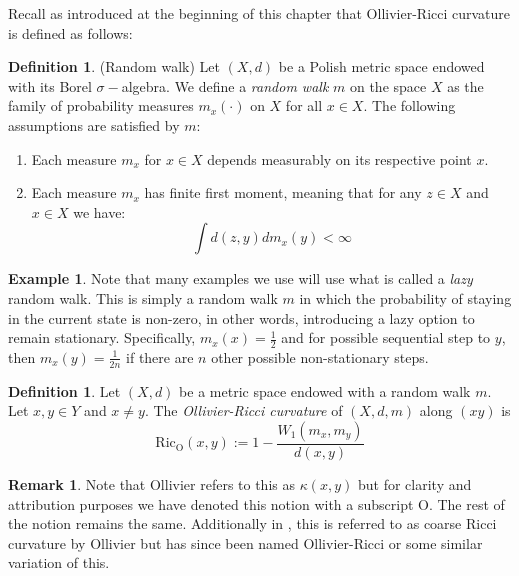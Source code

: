 \documentclass{Dissertate}
\theoremstyle{definition}
\theoremstyle{definition} %
\theoremstyle{definition}
\newtheorem{definition}[theorem]{Definition}
\newtheorem{example}[theorem]{Example}
\newtheorem{remark}[theorem]{Remark}
\begin{document}
Recall as introduced at the beginning of this chapter that Ollivier-Ricci curvature is defined as follows: 
\begin{definition} (Random walk) Let $(X,d)$ be a Polish metric space endowed with its Borel $\sigma-$algebra. We define a \textit{random walk} $m$ on the space $X$ as the family of probability measures $m_x(\cdot)$ on $X$ for all $x \in X$. The following assumptions are satisfied by $m$: 
\begin{enumerate}
    \item Each measure $m_x$ for $x \in X$ depends measurably on its respective point $x$. 
    \item Each measure $m_x$ has finite first moment, meaning that for any $z\in X$ and $x \in X$ we have: 
$$
\int d(z,y) d m_x (y) < \infty
$$
\end{enumerate} 
\end{definition}
\begin{example}
Note that many examples we use will use what is called a \textit{lazy} random walk. This is simply a random walk $m$ in which the probability of staying in the current state is non-zero, in other words, introducing a lazy option to remain stationary. Specifically, $m_x(x) = \frac{1}{2}$  and for possible sequential step to $y$, then $m_x(y) = \frac{1}{2n}$ if there are $n$ other possible non-stationary steps. 
\end{example}
\begin{definition} 
Let $(X,d)$ be a metric space endowed with a random walk $m$. Let $x,y \in Y$ 
and $x\neq y$. The \textit{Ollivier-Ricci curvature} of $(X,d,m)$ along $(xy)$ is 
\begin{equation}
\operatorname{Ric_O}(x,y) := 1 - \frac{W_1(m_x,m_y)}{d(x,y)}
\end{equation}
\end{definition}
\begin{remark}
Note that Ollivier refers to this as $\kappa(x,y)$ but for clarity and attribution purposes we have denoted this notion with a subscript O. The rest of the notion remains the same. Additionally in \cite{ollivier_ricci_2009}, this is referred to as coarse Ricci curvature by Ollivier but has since been named Ollivier-Ricci or some similar variation of this. 
\end{remark}
\end{document}
